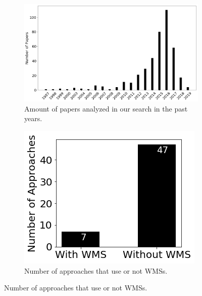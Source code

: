 \begin{figure}
\centering
\begin{subfigure}{.6\textwidth}
  \centering
  \includegraphics[width=1.0\linewidth]{img/timeline.png}
  \caption{Amount of papers analyzed in our search in the past years.}
  \label{fig:chap3_timeline}
\end{subfigure}%
\begin{subfigure}{.1\textwidth}
\end{subfigure}
\begin{subfigure}{.3\textwidth}
  \centering
  \includegraphics[width=1.0\linewidth]{img/chap3-wms-vs-nowms.png}
  \caption{Number of approaches that use or not WMSs.}
  \label{fig:chap3-wms-vs-nowms}
\end{subfigure}
\end{figure}


